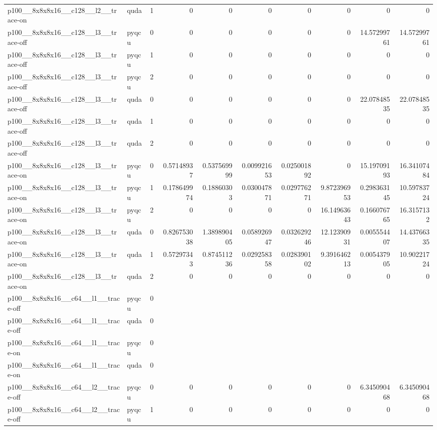 \begin{table}[htbp]
\begin{tabular}{@{}llrrrrrrrr@{}}
p100\_\_8x8x8x16\_\_c128\_\_l2\_\_trace-on & quda & 1 & 0 & 0 & 0 & 0 & 0 & 0 & 0 \\
p100\_\_8x8x8x16\_\_c128\_\_l3\_\_trace-off & pyqcu & 0 & 0 & 0 & 0 & 0 & 0 & 14.57299761 & 14.57299761 \\
p100\_\_8x8x8x16\_\_c128\_\_l3\_\_trace-off & pyqcu & 1 & 0 & 0 & 0 & 0 & 0 & 0 & 0 \\
p100\_\_8x8x8x16\_\_c128\_\_l3\_\_trace-off & pyqcu & 2 & 0 & 0 & 0 & 0 & 0 & 0 & 0 \\
p100\_\_8x8x8x16\_\_c128\_\_l3\_\_trace-off & quda & 0 & 0 & 0 & 0 & 0 & 0 & 22.07848535 & 22.07848535 \\
p100\_\_8x8x8x16\_\_c128\_\_l3\_\_trace-off & quda & 1 & 0 & 0 & 0 & 0 & 0 & 0 & 0 \\
p100\_\_8x8x8x16\_\_c128\_\_l3\_\_trace-off & quda & 2 & 0 & 0 & 0 & 0 & 0 & 0 & 0 \\
p100\_\_8x8x8x16\_\_c128\_\_l3\_\_trace-on & pyqcu & 0 & 0.57148937 & 0.537569999 & 0.009921653 & 0.025001892 & 0 & 15.19709193 & 16.34107484 \\
p100\_\_8x8x8x16\_\_c128\_\_l3\_\_trace-on & pyqcu & 1 & 0.178649974 & 0.18860303 & 0.030047871 & 0.029776271 & 9.872396953 & 0.298363145 & 10.59783724 \\
p100\_\_8x8x8x16\_\_c128\_\_l3\_\_trace-on & pyqcu & 2 & 0 & 0 & 0 & 0 & 16.14963643 & 0.166076765 & 16.3157132 \\
p100\_\_8x8x8x16\_\_c128\_\_l3\_\_trace-on & quda & 0 & 0.826753038 & 1.389890405 & 0.058926947 & 0.032629246 & 12.12390931 & 0.005554407 & 14.43766335 \\
p100\_\_8x8x8x16\_\_c128\_\_l3\_\_trace-on & quda & 1 & 0.57297343 & 0.874511236 & 0.029258358 & 0.028390102 & 9.391646213 & 0.005437905 & 10.90221724 \\
p100\_\_8x8x8x16\_\_c128\_\_l3\_\_trace-on & quda & 2 & 0 & 0 & 0 & 0 & 0 & 0 & 0 \\
p100\_\_8x8x8x16\_\_c64\_\_l1\_\_trace-off & pyqcu & 0 &  &  &  &  &  &  &  \\
p100\_\_8x8x8x16\_\_c64\_\_l1\_\_trace-off & quda & 0 &  &  &  &  &  &  &  \\
p100\_\_8x8x8x16\_\_c64\_\_l1\_\_trace-on & pyqcu & 0 &  &  &  &  &  &  &  \\
p100\_\_8x8x8x16\_\_c64\_\_l1\_\_trace-on & quda & 0 &  &  &  &  &  &  &  \\
p100\_\_8x8x8x16\_\_c64\_\_l2\_\_trace-off & pyqcu & 0 & 0 & 0 & 0 & 0 & 0 & 6.345090468 & 6.345090468 \\
p100\_\_8x8x8x16\_\_c64\_\_l2\_\_trace-off & pyqcu & 1 & 0 & 0 & 0 & 0 & 0 & 0 & 0 \\

\end{tabular}
\end{table}

